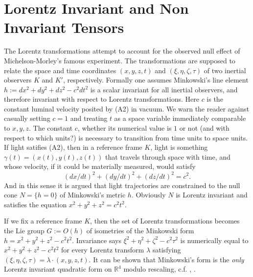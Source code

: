 \documentclass[12pt]{amsart}
\theoremstyle{definition}
\theoremstyle{remark}
\newcommand{\bR}{\mathbb{R}}
\begin{document}
\section{Lorentz Invariant and Non Invariant Tensors}\label{li}

The Lorentz transformations attempt to account for the observed null effect of Michelson-Morley's famous experiment. The transformations are supposed to relate the space and time coordinates $(x,y,z,t)$ and $(\xi, \eta, \zeta, \tau)$ of two inertial observers $K$ and $K'$, respectively. Formally one assumes Minkowski's line element $h:=dx^2+dy^2+dz^2-c^2dt^2$ is a scalar invariant for all inertial observers, and therefore invariant with respect to Lorentz transformations. Here $c$ is the constant luminal velocity posited by (A2) in vacuum. We warn the reader against casually setting $c=1$ and treating $t$ as a space variable immediately comparable to $x,y,z$. The constant $c$, whether its numerical value is $1$ or not (and with respect to which units?) is necessary to transition from time units to space units. If light satifies (A2), then in a reference frame $K$, light is something $\gamma(t)=(x(t),y(t),z(t))$ that travels through space with time, and whose velocity, if it could be materially measured, would satisfy $$(dx/dt)^2+(dy/dt)^2+(dz/dt)^2=c^2.$$ And in this sense it is argued that light trajectories are constrained to the null cone $N=\{h=0\}$ of Minkowski's metric $h$. Obviously $N$ is Lorentz invariant and satisfies the equation $x^2+y^2+z^2=c^2 t^2$. 

If we fix a reference frame $K$, then the set of Lorentz transformations becomes the Lie group $G:=O(h)$ of isometries of the Minkowski form $h=x^2+y^2+z^2-c^2t^2$. Invariance says $\xi^2+\eta^2+\zeta^2-c^2 \tau^2$ is numerically equal to $x^2+y^2+z^2-c^2 t^2$ for every Lorentz transform $\lambda$ satisfying $(\xi, \eta, \zeta, \tau)=\lambda \cdot (x,y,z,t)$.  It can be shown that Minkowski's form is the \emph{only} Lorentz invariant quadratic form on $\bR^4$ modulo rescaling, c.f. \cite{elton2010indefinite}, \cite{arminjon2018lorentz}.



\end{document}

